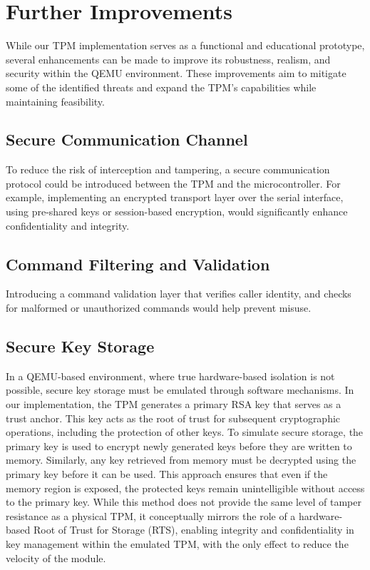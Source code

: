 \chapter{Further Improvements}
\label{chap4}

While our TPM implementation serves as a functional and educational prototype, 
several enhancements can be made to improve its robustness, realism, and security within the QEMU environment. 
These improvements aim to mitigate some of the identified threats and expand the 
TPM's capabilities while maintaining feasibility.

\section{Secure Communication Channel}
To reduce the risk of interception and tampering, a secure communication protocol could be 
introduced between the TPM and the microcontroller. 
For example, implementing an encrypted transport layer over the serial interface, 
using pre-shared keys or session-based encryption, would significantly enhance confidentiality and integrity.

\section{Command Filtering and Validation}
Introducing a command validation layer that verifies caller identity, 
and checks for malformed or unauthorized commands would help prevent misuse.

\section{Secure Key Storage}
In a QEMU-based environment, where true hardware-based isolation is not possible, 
secure key storage must be emulated through software mechanisms. 
In our implementation, the TPM generates a primary RSA key that serves as a trust anchor. 
This key acts as the root of trust for subsequent cryptographic operations, including the protection of other keys.
To simulate secure storage, the primary key is used to encrypt newly generated keys before they are written to memory. 
Similarly, any key retrieved from memory must be decrypted using the primary key before it can be used. 
This approach ensures that even if the memory region is exposed, the protected keys remain unintelligible without access to the primary key.
While this method does not provide the same level of tamper resistance as a physical TPM, 
it conceptually mirrors the role of a hardware-based Root of Trust for Storage (RTS), 
enabling integrity and confidentiality in key management within the emulated TPM, with the only effect to reduce the velocity of the module.

